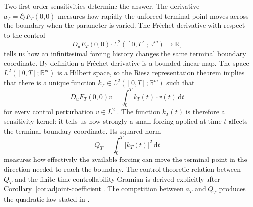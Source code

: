 \documentclass[11pt]{article}
\theoremstyle{definition}
\theoremstyle{remark}
\newcommand{\R}{\mathbb{R}}
\newcommand{\dd}{\mathrm{d}}
\begin{document}
Two first-order sensitivities determine the answer.  The derivative $a_T=\partial_\delta F_T(0,0)$ measures how rapidly the unforced terminal point moves across the boundary when the parameter is varied.  The Fr\'echet derivative with respect to the control,
\[
D_uF_T(0,0):L^2([0,T];\R^m)\longrightarrow\R,
\]
tells us how an infinitesimal forcing history changes the same terminal boundary coordinate.  By definition a Fr\'echet derivative is a bounded linear map.  The space $L^2([0,T];\R^m)$ is a Hilbert space, so the Riesz representation theorem implies that there is a unique function $k_T\in L^2([0,T];\R^m)$ such that
\begin{equation}
D_uF_T(0,0)v
=\int_0^T k_T(t)\cdot v(t)\,\dd t
\label{eq:Riesz-explained}
\end{equation}
for every control perturbation $v\in L^2$ \cite{Brezis2011}.  The function $k_T(t)$ is therefore a sensitivity kernel: it tells us how strongly a small forcing applied at time $t$ affects the terminal boundary coordinate.  Its squared norm
\[
Q_T=\int_0^T |k_T(t)|^2\,\dd t
\]
measures how effectively the available forcing can move the terminal point in the direction needed to reach the boundary.  The control-theoretic relation between $Q_T$ and the finite-time controllability Gramian is derived explicitly after Corollary~\ref{cor:adjoint-coefficient}.  The competition between $a_T$ and $Q_T$ produces the quadratic law stated in .
\end{document}
